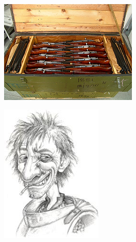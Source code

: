 \begin{figure}
	\begin{center}
		\includegraphics[width=\figwidth]{pics/6/55.png}
	\end{center}
\end{figure}

\begin{figure}
	\begin{center}
		\includegraphics[width=\figwidth]{pics/6/56.png}
	\end{center}
\end{figure}

